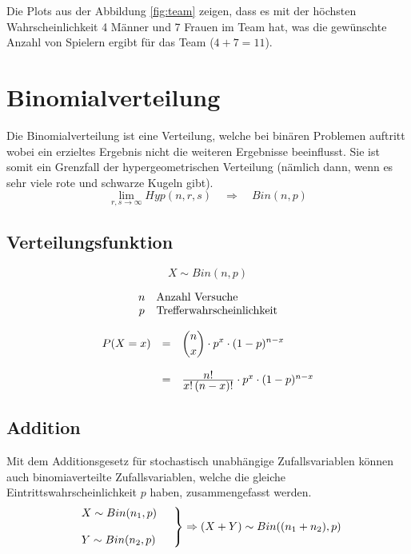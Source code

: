 \noindent
Die Plots aus der Abbildung \ref{fig:team} zeigen, dass es mit der 
höchsten Wahrscheinlichkeit
4 Männer und 7 Frauen im Team hat, was die gewünschte Anzahl von Spielern
ergibt für das Team ($4+7=11$). 

\clearpage
\newpage
\section{Binomialverteilung}
Die Binomialverteilung ist eine Verteilung, welche bei binären Problemen
auftritt wobei ein erzieltes Ergebnis nicht die weiteren Ergebnisse
beeinflusst. Sie ist somit ein Grenzfall der hypergeometrischen 
Verteilung (nämlich dann, wenn es sehr viele rote und schwarze 
Kugeln gibt).
\[ 
	\lim_{r,s \rightarrow \infty} Hyp(n,r,s) 
	\quad \Rightarrow \quad Bin(n,p)
\]

\subsection{Verteilungsfunktion}

\[ 
	X \sim Bin(n,p)
\]

\[ \begin{array}{c l} 
	n & \text{Anzahl Versuche} \\
	p & \text{Trefferwahrscheinlichkeit}
\end{array} \]

\[ \begin{array}{l c l} 
	P(X=x)
		&= 
		& \displaystyle \binom{n}{x} \cdot p^x 
			\cdot (1-p)^{n-x} \\
	& & \\
		&= 
		& \frac{\displaystyle n!}{\displaystyle x!\, (n-x)!} 
			\cdot p^x \cdot (1-p)^{n-x}
\end{array} \]

\subsection{Addition}
Mit dem Additionsgesetz für stochastisch unabhängige Zufallsvariablen 
können auch binomiaverteilte Zufallsvariablen, welche die gleiche
Eintrittswahrscheinlichkeit $p$ haben, zusammengefasst werden.
\[  
	\left.\begin{array}{l l }
		X \sim Bin(n_1, p) & \\
		& \\
		Y \sim Bin(n_2, p) & \\
	\end{array} \right\}
	\Rightarrow (X+Y) \sim Bin((n_1 + n_2), p)
\]

